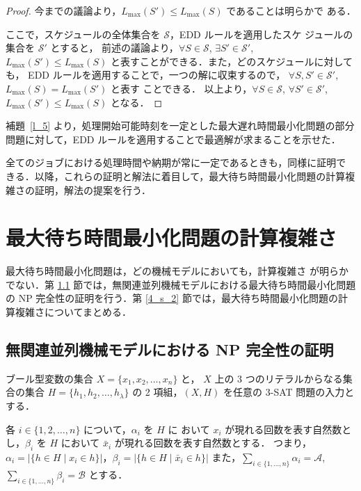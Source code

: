 \documentclass[12pt]{optlab-bachelor}
\begin{document}
\begin{proof}
  今までの議論より，$L_{\max}(S') \le L_{\max}(S)$ であることは明らかで
  ある．

  ここで，スケジュールの全体集合を $\mathcal{S}$，EDD ルールを適用したスケ
  ジュールの集合を $\mathcal{S}'$ とすると，
  前述の議論より，$\forall S \in \mathcal{S}$, $\exists S' \in \mathcal{S}'$, $L_{\max}(S') \le L_{\max}(S)$ と表すことができる．また，どのスケジュールに対しても，
  EDD ルールを適用することで，一つの解に収束するので，
  $\forall S, S' \in \mathcal{S}'$, $L_{\max}(S) = L_{\max}(S')$ と表す
  ことできる．
  以上より，$\forall S \in \mathcal{S}$, $\forall
  S' \in \mathcal{S}'$, $L_{\max}(S') \le L_{\max}(S)$ となる．
\end{proof}

補題~\ref{l_5} より，処理開始可能時刻を一定とした最大遅れ時間最小化問題の部分問題に対して，EDD ルールを適用することで最適解が求まることを示せた．

全てのジョブにおける処理時間や納期が常に一定であるときも，同様に証明で
きる．以降，これらの証明と解法に着目して，最大待ち時間最小化問題の計算複雑さの証明，解法の提案を行う．

\chapter{最大待ち時間最小化問題の計算複雑さ}\label{c_4}
最大待ち時間最小化問題は，どの機械モデルにおいても，計算複雑さ
が明らかでない．第 \ref{4_s_1} 節では，無関連並列機械モデルにおける最大待ち時間最小化問題の NP 完全性の証明を行う．第 \ref{4_s_2} 節では，最大待ち時間最小化問題の計算複雑さについてまとめる．

\section{無関連並列機械モデルにおける NP 完全性の証明}\label{4_s_1}

ブール型変数の集合 $X =\{x_1, x_2,\ldots ,x_n\}$ と， $X$ 上の 3 つのリテラルからなる集合の集合 $H =\{h_1, h_2,\ldots ,h_{\lambda}\}$ の 2 項組，$(X,H)$ を任意の \textsc{3-SAT} 問題の入力とする．

各 $i \in \{1,2,\ldots, n\}$ について，$\alpha_i$ を $H$ に おいて $x_i$ が現れる回数を表す自然数とし，$\beta_i$ を $H$ において $\bar x_i$ が現れる回数を表す自然数とする．
つまり，$\alpha_i = \big|\{h \in H \mid x_i \in h\}\big|$，$\beta_i = \big|\{h \in H \mid \bar x_i \in h\}\big|$
また，$\displaystyle \sum_{i \in \{1,\ldots,n\}} \alpha_i = \mathcal{A}$, $\displaystyle \sum_{i \in \{1,\ldots,n\}} \beta_i = \mathcal{B}$  とする．
\end{document}
